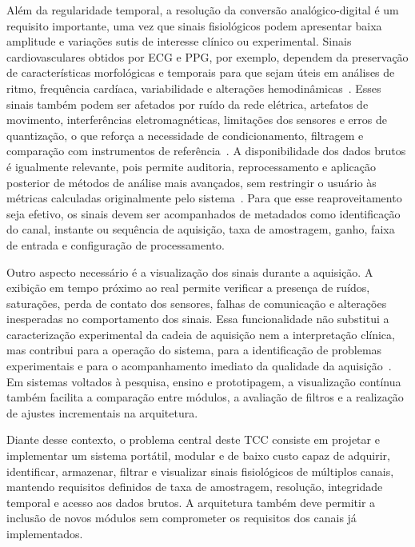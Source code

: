 \documentclass[a4paper,12pt]{fcte}
\begin{document}
Além da regularidade temporal, a resolução da conversão analógico-digital é um requisito importante, uma vez que sinais fisiológicos podem apresentar baixa amplitude e variações sutis de interesse clínico ou experimental. Sinais cardiovasculares obtidos por ECG e PPG, por exemplo, dependem da preservação de características morfológicas e temporais para que sejam úteis em análises de ritmo, frequência cardíaca, variabilidade e alterações hemodinâmicas~\cite{hughes2023wearable_cardiovascular,charlton2022wearable_ppg}. Esses sinais também podem ser afetados por ruído da rede elétrica, artefatos de movimento, interferências eletromagnéticas, limitações dos sensores e erros de quantização, o que reforça a necessidade de condicionamento, filtragem e comparação com instrumentos de referência~\cite{charlton2022wearable_ppg,ates2022wearable_sensors}. A disponibilidade dos dados brutos é igualmente relevante, pois permite auditoria, reprocessamento e aplicação posterior de métodos de análise mais avançados, sem restringir o usuário às métricas calculadas originalmente pelo sistema~\cite{canali2022wearables_challenges,abedi2025ai_cardiovascular_wearables}. Para que esse reaproveitamento seja efetivo, os sinais devem ser acompanhados de metadados como identificação do canal, instante ou sequência de aquisição, taxa de amostragem, ganho, faixa de entrada e configuração de processamento.

Outro aspecto necessário é a visualização dos sinais durante a aquisição. A exibição em tempo próximo ao real permite verificar a presença de ruídos, saturações, perda de contato dos sensores, falhas de comunicação e alterações inesperadas no comportamento dos sinais. Essa funcionalidade não substitui a caracterização experimental da cadeia de aquisição nem a interpretação clínica, mas contribui para a operação do sistema, para a identificação de problemas experimentais e para o acompanhamento imediato da qualidade da aquisição~\cite{devi2020realtimedaq,huhn2022wearables_health_research}. Em sistemas voltados à pesquisa, ensino e prototipagem, a visualização contínua também facilita a comparação entre módulos, a avaliação de filtros e a realização de ajustes incrementais na arquitetura.

Diante desse contexto, o problema central deste TCC consiste em projetar e implementar um sistema portátil, modular e de baixo custo capaz de adquirir, identificar, armazenar, filtrar e visualizar sinais fisiológicos de múltiplos canais, mantendo requisitos definidos de taxa de amostragem, resolução, integridade temporal e acesso aos dados brutos. A arquitetura também deve permitir a inclusão de novos módulos sem comprometer os requisitos dos canais já implementados.
\end{document}
